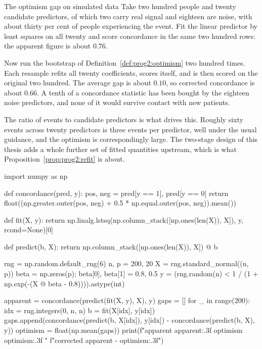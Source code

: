 \begin{workedexample}{The optimism gap on simulated data}
Take two hundred people and twenty candidate predictors, of which two carry
real signal and eighteen are noise, with about thirty per cent of people
experiencing the event. Fit the linear predictor by least squares on all twenty
and score concordance in the same two hundred rows: the apparent figure is
about $0.76$.

Now run the bootstrap of Definition~\ref{def:prog2:optimism} two hundred times.
Each resample refits all twenty coefficients, scores itself, and is then
scored on the original two hundred. The average gap is about $0.10$, so
corrected concordance is about $0.66$. A tenth of a concordance statistic has
been bought by the eighteen noise predictors, and none of it would survive
contact with new patients.

The ratio of events to candidate predictors is what drives this. Roughly sixty
events across twenty predictors is three events per predictor, well under the
usual guidance, and the optimism is correspondingly large. The two-stage design
of this thesis adds a whole further set of fitted quantities upstream, which is
what Proposition~\ref{prop:prog2:refit} is about.

\begin{wecode}[Python]
import numpy as np

def concordance(pred, y):
    pos, neg = pred[y == 1], pred[y == 0]
    return float((np.greater.outer(pos, neg)
                  + 0.5 * np.equal.outer(pos, neg)).mean())

def fit(X, y):
    return np.linalg.lstsq(np.column_stack([np.ones(len(X)), X]),
                           y, rcond=None)[0]

def predict(b, X):
    return np.column_stack([np.ones(len(X)), X]) @ b

rng = np.random.default_rng(6)
n, p = 200, 20
X = rng.standard_normal((n, p))
beta = np.zeros(p); beta[0], beta[1] = 0.8, 0.5
y = (rng.random(n) < 1 / (1 + np.exp(-(X @ beta - 0.8)))).astype(int)

apparent = concordance(predict(fit(X, y), X), y)
gaps = []
for _ in range(200):
    idx = rng.integers(0, n, n)
    b = fit(X[idx], y[idx])
    gaps.append(concordance(predict(b, X[idx]), y[idx])
                - concordance(predict(b, X), y))
optimism = float(np.mean(gaps))
print(f"apparent {apparent:.3f}  optimism {optimism:.3f}  "
      f"corrected {apparent - optimism:.3f}")
\end{wecode}

\end{workedexample}

